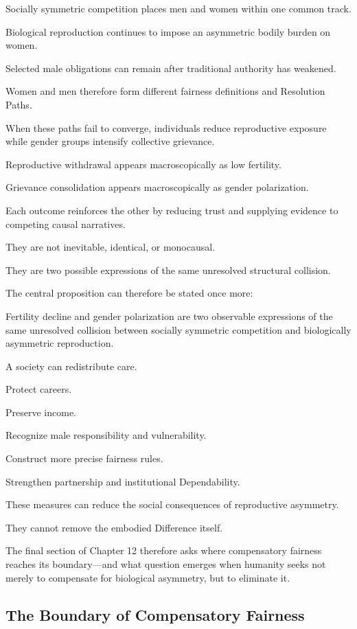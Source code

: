 Socially symmetric competition places men and women within one common track.

Biological reproduction continues to impose an asymmetric bodily burden on women.

Selected male obligations can remain after traditional authority has weakened.

Women and men therefore form different fairness definitions and Resolution Paths.

When these paths fail to converge, individuals reduce reproductive exposure while gender groups intensify collective grievance.

Reproductive withdrawal appears macroscopically as low fertility.

Grievance consolidation appears macroscopically as gender polarization.

Each outcome reinforces the other by reducing trust and supplying evidence to competing causal narratives.

They are not inevitable, identical, or monocausal.

They are two possible expressions of the same unresolved structural collision.

The central proposition can therefore be stated once more:

Fertility decline and gender polarization are two observable expressions of the same unresolved collision between socially symmetric competition and biologically asymmetric reproduction.

A society can redistribute care.

Protect careers.

Preserve income.

Recognize male responsibility and vulnerability.

Construct more precise fairness rules.

Strengthen partnership and institutional Dependability.

These measures can reduce the social consequences of reproductive asymmetry.

They cannot remove the embodied Difference itself.

The final section of Chapter 12 therefore asks where compensatory fairness reaches its boundary—and what question emerges when humanity seeks not merely to compensate for biological asymmetry, but to eliminate it.

\subsection*{\textbf{The Boundary of Compensatory Fairness}} 


